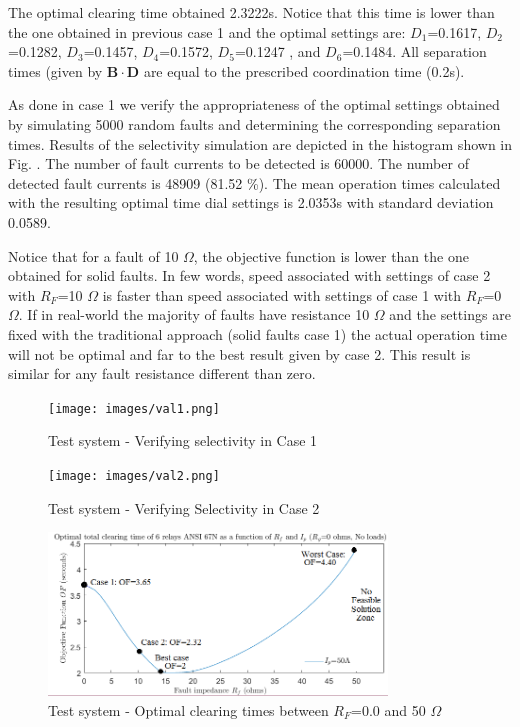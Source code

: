 \documentclass[letterpaper, 10 pt, conference]{IEEEtran}
\begin{document}
The optimal clearing time obtained 2.3222s. Notice that this time is lower than the one obtained in previous case 1 and the optimal settings are:
$D_1$=0.1617,
$D_2$=0.1282,
$D_3$=0.1457,
$D_4$=0.1572,
$D_5$=0.1247
, and $D_6$=0.1484. All separation times (given by $\mathbf{B}\cdot \mathbf{D}$ are equal to the prescribed coordination time (0.2s).


As done in case 1 we verify the appropriateness of the optimal settings obtained by simulating 5000 random faults and determining the corresponding separation times. Results of the selectivity simulation are depicted in the histogram shown in Fig. \label{figure6x}. The number of fault currents to be detected is 60000.
The number of detected fault currents is  48909 (81.52 \%). The mean operation times calculated with the resulting optimal time dial settings is  2.0353s with standard deviation
 0.0589.




Notice that for a fault of 10 $\Omega$, the objective function is lower than the one obtained for solid faults. In few words, speed associated with settings of case 2 with $R_F$=10 $\Omega$ is faster than speed associated with settings of case 1 with $R_F$=0  $\Omega$. If in real-world the majority of faults have resistance 10 $\Omega$ and the settings are fixed with the traditional approach (solid faults case 1) the actual operation time will not be optimal and far to the best result given by case 2. This result is similar for any fault resistance different than zero.
 \begin{figure}[t!] \centerline{
     \texttt{[image: images/val1.png]}}
       \caption{Test system - Verifying selectivity in Case 1}
      \label{figure5x}
        \end{figure}

 \begin{figure}[t!] \centerline{
     \texttt{[image: images/val2.png]}}
       \caption{Test system - Verifying Selectivity in Case 2}
      \label{figure6x}
        \end{figure}
        

 \begin{figure}[t!] \centerline{
     \includegraphics[width=9cm]{images/OF.png}}
       \caption{Test system - Optimal clearing times between $R_F$=0.0 and 50 $\Omega$}
      \label{figure5}
        \end{figure}
\end{document}
